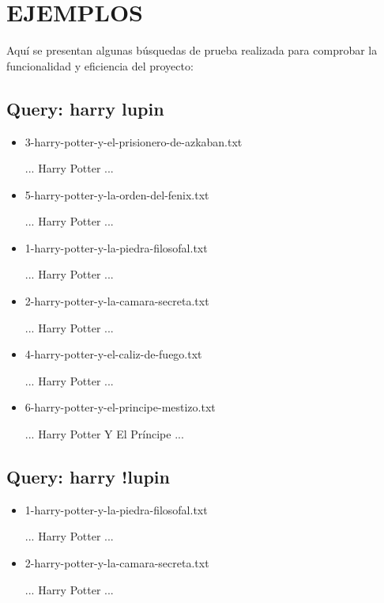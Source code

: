 \documentclass[a4paper,12pt,]{article}
\begin{document}
\section*{EJEMPLOS}
Aquí se presentan algunas búsquedas de prueba realizada para comprobar la funcionalidad y eficiencia del proyecto:

\subsection*{Query: harry lupin}
\begin{itemize}
    \item 3-harry-potter-y-el-prisionero-de-azkaban.txt
   
    ... Harry Potter ...

    \item 5-harry-potter-y-la-orden-del-fenix.txt
    
    ... Harry Potter ...

    \item 1-harry-potter-y-la-piedra-filosofal.txt
    
    ... Harry Potter ...

    \item 2-harry-potter-y-la-camara-secreta.txt
    
    ... Harry Potter ...

    \item 4-harry-potter-y-el-caliz-de-fuego.txt
    
    ... Harry Potter ...

    \item 6-harry-potter-y-el-principe-mestizo.txt
    
    ... Harry Potter Y El Príncipe ...
\end{itemize}

\subsection*{Query: harry !lupin}
\begin{itemize}
    \item 1-harry-potter-y-la-piedra-filosofal.txt
    
    ... Harry Potter ...

    \item 2-harry-potter-y-la-camara-secreta.txt
    
    ... Harry Potter ...
\end{itemize}
\end{document}
